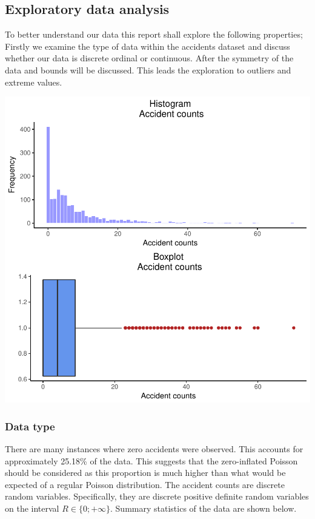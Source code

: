 \documentclass[11pt,preprint, authoryear]{elsarticle}
\numberwithin{equation}{section}
\numberwithin{figure}{section}
\numberwithin{table}{section}
\begin{document}
\subsection{Exploratory data analysis}\label{exploratory-data-analysis}

To better understand our data this report shall explore the following
properties; Firstly we examine the type of data within the accidents
dataset and discuss whether our data is discrete ordinal or continuous.
After the symmetry of the data and bounds will be discussed. This leads
the exploration to outliers and extreme values.

\includegraphics{likelihood_files/figure-latex/unnamed-chunk-1-1.pdf}

\subsubsection{\texorpdfstring{Data type
\label{data_description}}{Data type }}\label{data-type}

There are many instances where zero accidents were observed. This
accounts for approximately 25.18\% of the data. This suggests that the
zero-inflated Poisson should be considered as this proportion is much
higher than what would be expected of a regular Poisson distribution.
The accident counts are discrete random variables. Specifically, they
are discrete positive definite random variables on the interval
\(R \in \{0;+ \infty\}\). Summary statistics of the data are shown
below.
\end{document}
